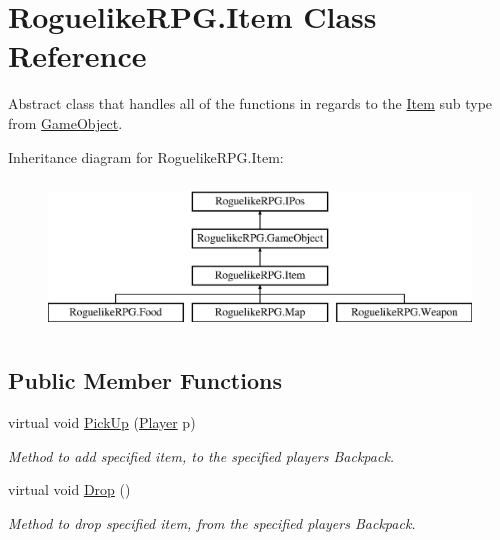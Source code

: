 \hypertarget{class_roguelike_r_p_g_1_1_item}{}\section{Roguelike\+R\+P\+G.\+Item Class Reference}
\label{class_roguelike_r_p_g_1_1_item}


Abstract class that handles all of the functions in regards to the \mbox{\hyperlink{class_roguelike_r_p_g_1_1_item}{Item}} sub type from \mbox{\hyperlink{class_roguelike_r_p_g_1_1_game_object}{Game\+Object}}.  


Inheritance diagram for Roguelike\+R\+P\+G.\+Item\+:\begin{figure}[H]
\begin{center}
\leavevmode
\includegraphics[height=4.000000cm]{class_roguelike_r_p_g_1_1_item}
\end{center}
\end{figure}
\subsection*{Public Member Functions}
\begin{DoxyCompactItemize}
\item 
virtual void \mbox{\hyperlink{class_roguelike_r_p_g_1_1_item_accf1844a3b2b53b75d8974ba14509c82}{Pick\+Up}} (\mbox{\hyperlink{class_roguelike_r_p_g_1_1_player}{Player}} p)
\begin{DoxyCompactList}\small\item\em Method to add specified item, to the specified player\textquotesingle{}s Backpack. \end{DoxyCompactList}\item 
virtual void \mbox{\hyperlink{class_roguelike_r_p_g_1_1_item_ae46e19cf36347b93f56704516c0c6618}{Drop}} ()
\begin{DoxyCompactList}\small\item\em Method to drop specified item, from the specified player\textquotesingle{}s Backpack. \end{DoxyCompactList}\end{DoxyCompactItemize}
